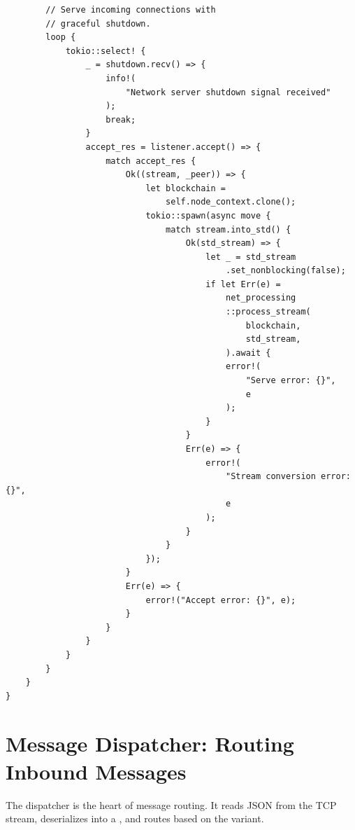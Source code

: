\begin{listing}[htbp]
\begin{verbatim}
        // Serve incoming connections with
        // graceful shutdown.
        loop {
            tokio::select! {
                _ = shutdown.recv() => {
                    info!(
                        "Network server shutdown signal received"
                    );
                    break;
                }
                accept_res = listener.accept() => {
                    match accept_res {
                        Ok((stream, _peer)) => {
                            let blockchain =
                                self.node_context.clone();
                            tokio::spawn(async move {
                                match stream.into_std() {
                                    Ok(std_stream) => {
                                        let _ = std_stream
                                            .set_nonblocking(false);
                                        if let Err(e) =
                                            net_processing
                                            ::process_stream(
                                                blockchain,
                                                std_stream,
                                            ).await {
                                            error!(
                                                "Serve error: {}",
                                                e
                                            );
                                        }
                                    }
                                    Err(e) => {
                                        error!(
                                            "Stream conversion error: {}",
                                            e
                                        );
                                    }
                                }
                            });
                        }
                        Err(e) => {
                            error!("Accept error: {}", e);
                        }
                    }
                }
            }
        }
    }
}
\end{verbatim}
\end{listing}

\section{Message Dispatcher: Routing Inbound Messages}
\label{sec:ch12-dispatcher}

The dispatcher is the heart of message routing. It reads JSON from the TCP stream, deserializes into a , and routes based on the variant.

